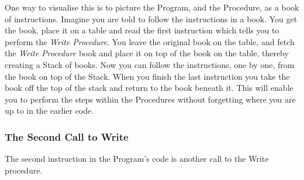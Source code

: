 
One way to visualise this is to picture the Program, and the Procedure, as a book of instructions. Imagine you are told to follow the instructions in a book. You get the book, place it on a table and read the first instruction which tells you to perform the \emph{Write Procedure}. You leave the original book on the table, and fetch the \emph{Write Procedure} book and place it on top of the book on the table, thereby creating a Stack of books. Now you can follow the instructions, one by one, from the book on top of the Stack. When you finish the last instruction you take the book off the top of the stack and return to the book beneath it. This will enable you to perform the steps within the Procedures without forgetting where you are up to in the earlier code.


\clearpage
\subsubsection{The Second Call to Write} %
\label{ssub:the_second_call_to_write}

The second instruction in the Program's code is another call to the Write procedure.

